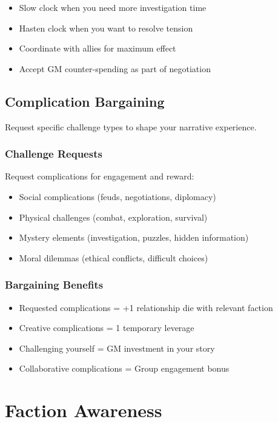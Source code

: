 \begin{itemize}
\item Slow clock when you need more investigation time
\item Hasten clock when you want to resolve tension
\item Coordinate with allies for maximum effect
\item Accept GM counter-spending as part of negotiation
\end{itemize}

\subsection{Complication Bargaining}

Request specific challenge types to shape your narrative experience.

\subsubsection{Challenge Requests}

Request complications for engagement and reward:
\begin{itemize}
\item Social complications (feuds, negotiations, diplomacy)
\item Physical challenges (combat, exploration, survival)
\item Mystery elements (investigation, puzzles, hidden information)
\item Moral dilemmas (ethical conflicts, difficult choices)
\end{itemize}

\subsubsection{Bargaining Benefits}

\begin{itemize}
\item Requested complications = +1 relationship die with relevant faction
\item Creative complications = 1 temporary leverage
\item Challenging yourself = GM investment in your story
\item Collaborative complications = Group engagement bonus
\end{itemize}

\section{Faction Awareness}


